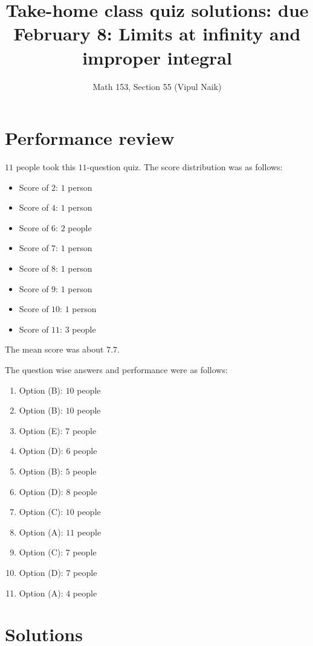 \documentclass[10pt]{amsart}
\title{Take-home class quiz solutions: due February 8: Limits at infinity and improper integral}
\author{Math 153, Section 55 (Vipul Naik)}
\begin{document}
\maketitle

\section{Performance review}

$11$ people took this $11$-question quiz. The score distribution was
as follows:

\begin{itemize}
\item Score of $2$: $1$ person
\item Score of $4$: $1$ person
\item Score of $6$: $2$ people
\item Score of $7$: $1$ person
\item Score of $8$: $1$ person
\item Score of $9$: $1$ person
\item Score of $10$: $1$ person
\item Score of $11$: $3$ people
\end{itemize}

The mean score was about $7.7$.

The question wise answers and performance were as follows:

\begin{enumerate}
\item Option (B): $10$ people
\item Option (B): $10$ people
\item Option (E): $7$ people
\item Option (D): $6$ people
\item Option (B): $5$ people
\item Option (D): $8$ people
\item Option (C): $10$ people
\item Option (A): $11$ people
\item Option (C): $7$ people
\item Option (D): $7$ people
\item Option (A): $4$ people
\end{enumerate}

\section{Solutions}
\end{document}
